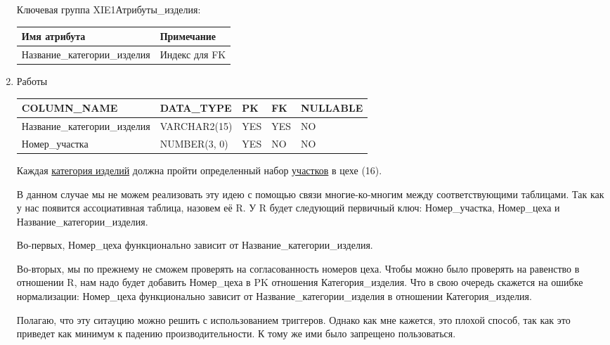 \begin{enumerate}
\begin{tabular}{|p{4cm}|p{5cm}|}
    \end{tabular}

    Ключевая группа XIE1Атрибуты\_изделия:

    \begin{tabular}{|p{4cm}|p{5cm}|} \hline

        {\bf Имя атрибута} & {\bf Примечание} \\ \hline
        Название\_категории\_изделия & Индекс для FK \\ \hline

    \end{tabular}

    \item Работы

    \begin{tabular}{|p{4cm}|p{3cm}|p{1cm}|p{1cm}|p{2cm}|} \hline

        {\bf COLUMN\_NAME} & {\bf DATA\_TYPE} & {\bf PK} & {\bf FK} & {\bf NULLABLE} \\ \hline
        Название\_категории\_изделия & VARCHAR2(15) & YES & YES & NO \\ \hline
        Номер\_участка & NUMBER(3, 0) & YES & NO & NO \\ \hline

    \end{tabular}

    Каждая \underline{категория изделий} должна пройти определенный набор \underline{участков} в цехе (16).

    В данном случае мы не можем реализовать эту идею с помощью связи многие-ко-многим между соответствующими таблицами.
    Так как у нас появится ассоциативная таблица, назовем её R.
    У R будет следующий первичный ключ: Номер\_участка, Номер\_цеха и Название\_категории\_изделия.

    Во-первых, Номер\_цеха функционально зависит от Название\_категории\_изделия.

    Во-вторых, мы по прежнему не сможем проверять на согласованность номеров цеха.
    Чтобы можно было проверять на равенство в отношении R, нам надо будет добавить Номер\_цеха в PK отношения Категория\_изделия.
    Что в свою очередь скажется на ошибке нормализации:
    Номер\_цеха функционально зависит от Название\_категории\_изделия в отношении Категория\_изделия.

    Полагаю, что эту ситауцию можно решить с использованием триггеров.
    Однако как мне кажется, это плохой способ, так как это приведет как минимум к падению производительности.
    К тому же ими было запрещено пользоваться.


\end{enumerate}
